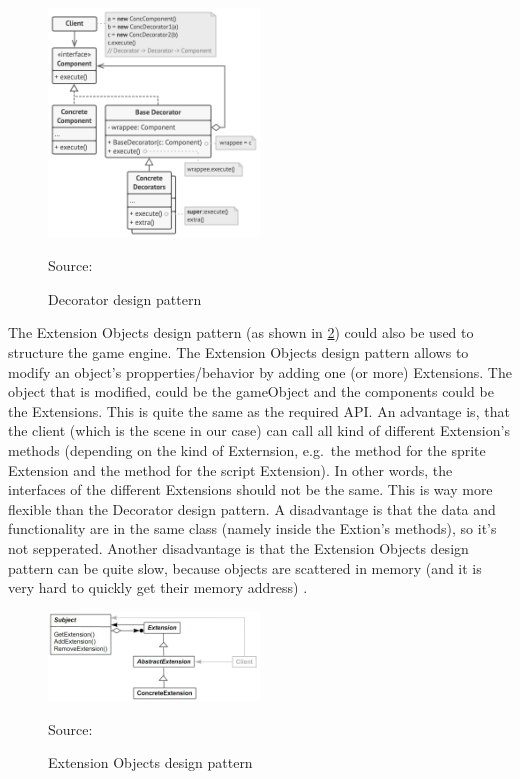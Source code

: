 \documentclass{projdoc}
\begin{document}
\begin{figure}
	\centering
	\includegraphics[width=0.5\textwidth]{img/DecoratorDesignPattern.png}
	\caption{Decorator design pattern}
	Source: \autocite{img:Decorator}
	\label{fig:decorator}
\end{figure}

The Extension Objects design pattern (as shown in \cref{fig:extension objects}) could
also be used to structure the game engine. The Extension Objects design pattern
allows to modify an object's propperties/behavior by adding one (or more) Extensions.
The object that is modified, could be the gameObject and the components could be the
Extensions. This is quite the same as the required API. An advantage is, that the
client (which is the scene in our case) can call all kind of different Extension's
methods (depending on the kind of Externsion, e.g.~the method 
for the sprite Extension and the method  for the script
Extension). In other words, the interfaces of the different Extensions should not be
the same. This is way more flexible than the Decorator design pattern. A disadvantage
is that the data and functionality are in the same class (namely inside the Extion's
methods), so it's not sepperated. Another disadvantage is that the Extension Objects
design pattern can be quite slow, because objects are scattered in memory (and it is
very hard to quickly get their memory address)
\autocite{man:ExtensionObjectDesignPattern, man:extionsionObjectsStackOverflow}.

\begin{figure}
	\centering
	\includegraphics[width=0.5\textwidth]{img/ExtensionObjects.jpg}
	\caption{Extension Objects design pattern}
	Source: \autocite{img:extionsionObjects}
	\label{fig:extension objects}
\end{figure}
\end{document}
